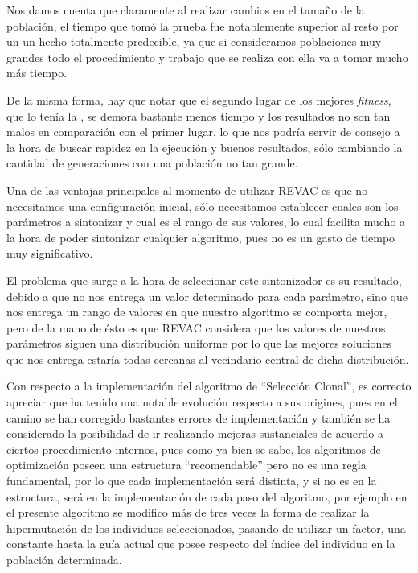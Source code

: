 Nos damos cuenta que claramente al realizar cambios en el tamaño de la población, el tiempo que tomó la prueba fue
notablemente superior al resto por un un hecho totalmente predecible, ya que si consideramos poblaciones muy grandes
todo el procedimiento y trabajo que se realiza con ella va a tomar mucho más tiempo.

De la misma forma, hay que notar que el segundo lugar de los mejores \emph{fitness}, que lo tenía la ,
se demora bastante menos tiempo y los resultados no son tan malos en comparación con el primer lugar, lo que nos podría
servir de consejo a la hora de buscar rapidez en la ejecución y buenos resultados, sólo cambiando la cantidad de generaciones
con una población no tan grande.


Una de las ventajas principales al momento de utilizar REVAC es que no necesitamos una configuración inicial,
sólo necesitamos establecer cuales son los parámetros a sintonizar y cual es el rango de sus valores, lo cual
facilita mucho a la hora de poder sintonizar cualquier algoritmo, pues no es un gasto de tiempo muy significativo.

El problema que surge a la hora de seleccionar este sintonizador es su resultado, debido a que no nos entrega
un valor determinado para cada parámetro, sino que nos entrega un rango de valores en que nuestro algoritmo se comporta mejor,
pero de la mano de ésto es que REVAC considera que los valores de nuestros parámetros siguen una distribución uniforme
por lo que las mejores soluciones que nos entrega estaría todas cercanas al vecindario central de dicha distribución.

Con respecto a la implementación del algoritmo de ``Selección Clonal'', es correcto apreciar que ha tenido una notable
evolución respecto a sus origines, pues en el camino se han corregido bastantes errores de implementación y también
se ha considerado la posibilidad de ir realizando mejoras sustanciales de acuerdo a ciertos procedimiento internos,
pues como ya bien se sabe, los algoritmos de optimización poseen una estructura ``recomendable'' pero no es una regla
fundamental, por lo que cada implementación será distinta, y si no es en la estructura, será en la implementación de cada
paso del algoritmo, por ejemplo en el presente algoritmo se modifico más de tres veces la forma de realizar la hipermutación
de los individuos seleccionados, pasando de utilizar un factor, una constante hasta la guía actual que posee respecto
del índice del individuo en la población determinada.

